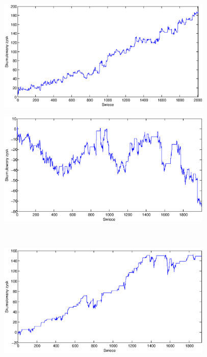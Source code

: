 \begin{figure}[h]
\centering
\begin{minipage}{.49\linewidth}
\centering
\includegraphics[width=0.92\textwidth]{images/S1a_fus500.eps}
\label{jedno}
\end{minipage}
\begin{minipage}{.49\linewidth}
\centering
\includegraphics[width=0.92\textwidth]{images/S1b_fus500.eps}
\label{dwu}
\end{minipage}
\\
\begin{minipage}{.49\linewidth}
\centering
\includegraphics[width=0.92\textwidth]{images/S1c_fus500.eps}

\end{minipage}
\end{figure}
